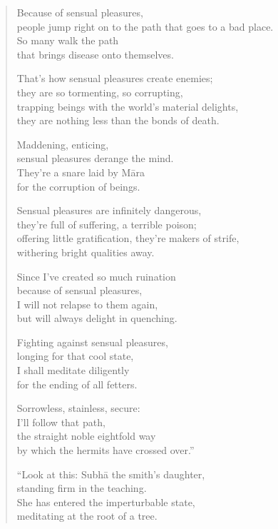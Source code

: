 \documentclass[12pt,openany]{book}%
\begin{document}
\begin{verse}
Because of sensual pleasures, \\
people jump right on to the path that goes to a bad place. \\
So many walk the path \\
that brings disease onto themselves. 

That’s how sensual pleasures create enemies; \\
they are so tormenting, so corrupting, \\
trapping beings with the world’s material delights, \\
they are nothing less than the bonds of death. 

Maddening, enticing, \\
sensual pleasures derange the mind. \\
They’re a snare laid by \textsanskrit{Māra} \\
for the corruption of beings. 

Sensual pleasures are infinitely dangerous, \\
they’re full of suffering, a terrible poison; \\
offering little gratification, they’re makers of strife, \\
withering bright qualities away. 

Since I’ve created so much ruination \\
because of sensual pleasures, \\
I will not relapse to them again, \\
but will always delight in quenching. 

Fighting against sensual pleasures, \\
longing for that cool state, \\
I shall meditate diligently \\
for the ending of all fetters. 

Sorrowless, stainless, secure: \\
I’ll follow that path, \\
the straight noble eightfold way \\
by which the hermits have crossed over.” 

“Look at this: \textsanskrit{Subhā} the smith’s daughter, \\
standing firm in the teaching. \\
She has entered the imperturbable state, \\
meditating at the root of a tree. 


\end{verse}
\end{document}
